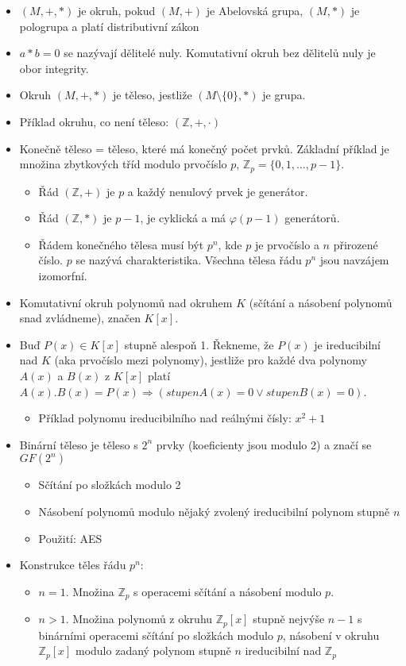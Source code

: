 \documentclass[a4paper,hidelinks]{article}
\begin{document}
\begin{itemize}
    \item $(M, +, *)$ je okruh, pokud $(M, +)$ je Abelovská grupa, $(M, *)$ je pologrupa a platí distributivní zákon
    \item $a * b = 0$ se nazývají dělitelé nuly. Komutativní okruh bez dělitelů nuly je obor integrity.
    \item Okruh $(M, +, *)$ je těleso, jestliže $(M \setminus \{0\}, *)$ je grupa.
    \item Příklad okruhu, co není těleso: $(\mathbb{Z}, +, \cdot)$
    \item Konečně těleso = těleso, které má konečný počet prvků. Základní příklad je množina zbytkových tříd modulo prvočíslo $p$, $\mathbb{Z}_p = \{0, 1, \ldots, p-1\}$.
    \begin{itemize}
        \item Řád $(\mathbb{Z}, +)$ je $p$ a každý nenulový prvek je generátor.
        \item Řád $(\mathbb{Z}, *)$ je $p-1$, je cyklická a má $\varphi(p-1)$ generátorů.
        \item Řádem konečného tělesa musí být $p^n$, kde $p$ je prvočíslo a $n$ přirozené číslo. $p$ se nazývá charakteristika. Všechna tělesa řádu $p^n$ jsou navzájem izomorfní.
    \end{itemize}
    \item Komutativní okruh polynomů nad okruhem $K$ (sčítání a násobení polynomů snad zvládneme), značen $K[x]$.
    \item Buď $P(x) \in K[x]$ stupně alespoň 1. Řekneme, že $P(x)$ je ireducibilní nad $K$ (aka prvočíslo mezi polynomy), jestliže pro každé dva polynomy $A(x)$ a $B(x)$ z $K[x]$ platí $A(x) . B(x) = P(x) \Rightarrow (stupen A(x) = 0 \vee stupen B(x) = 0)$.
    \begin{itemize}
        \item Příklad polynomu ireducibilního nad reálnými čísly: $x^2 + 1$
    \end{itemize}
    \item Binární těleso je těleso s $2^n$ prvky (koeficienty jsou modulo 2) a značí se $GF(2^n)$
    \begin{itemize}
        \item Sčítání po složkách modulo 2
        \item Násobení polynomů modulo nějaký zvolený ireducibilní polynom stupně $n$
        \item Použití: AES
    \end{itemize}
    \item Konstrukce těles řádu $p^n$:
    \begin{itemize}
        \item $n = 1$. Množina $\mathbb{Z}_p$ s operacemi sčítání a násobení modulo $p$. 
        \item $n > 1$. Množina polynomů z okruhu $\mathbb{Z}_p[x]$ stupně nejvýše $n-1$ s binárními operacemi sčítání po složkách modulo $p$, násobení v okruhu $\mathbb{Z}_p[x]$ modulo zadaný polynom stupně $n$ ireducibilní nad $\mathbb{Z}_p$
    \end{itemize}
\end{itemize}
\end{document}
